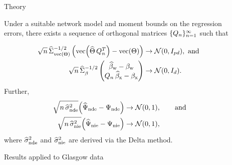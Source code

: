 \documentclass[final]{beamer}
\newlength{\sepwidth}
\newlength{\colwidth}
\newcommand{\separatorcolumn}{\begin{column}{\sepwidth}\end{column}}
\begin{document}
\begin{frame}[t]
\begin{columns}[t]
\begin{column}{\colwidth}
        \end{column}

        \separatorcolumn

        \begin{column}{\colwidth}

            \begin{exampleblock}{Theory}

                Under a suitable network model and moment bounds on the regression errors, there exists a sequence of orthogonal matrices $\{Q_n\}_{n=1}^\infty$ such that

                \begin{equation*}
                    \begin{aligned}
                        \sqrt{ n } \,
                        \Sigmahattheta^{-1/2}
                        \begin{pmatrix}
                            \vecc \paren*{\Thetahat \, Q_n^T} - \Thetavec
                        \end{pmatrix}
                         & \to
                        \Normal{0}{I_{p d}}, \text{ and } \\
                        \sqrt{ n } \,
                        \Sigmahatbeta^{-1/2}
                        \begin{pmatrix}
                            \betawhat - \betaw \\
                            Q_n \, \betaxhat - \betax
                        \end{pmatrix}
                         & \to
                        \Normal{0}{I_d}.
                    \end{aligned}
                \end{equation*}
                Further,
                \begin{align*}
                    \sqrt{n \, \sigmahatnde} \paren*{\ndehat - \nde}
                     & \to
                    \Normal{0}{1}, \qquad \text{and} \\
                    \sqrt{n \, \sigmahatnie} \paren*{\niehat - \nie}
                     & \to
                    \Normal{0}{1},
                \end{align*}
                where $\widehat{\sigma}^2_\mathrm{nde}$ and $\widehat{\sigma}^2_\mathrm{nie}$ are derived via the Delta method.

            \end{exampleblock}

            \begin{block}{Results applied to Glasgow data}



\end{block}
\end{column}
\end{columns}
\end{frame}
\end{document}
